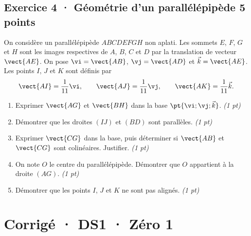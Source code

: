 \subsection*{Exercice 4 · Géométrie d'un parallélépipède \hfill 5 points}On considère un parallélépipède $ABCDEFGH$ non aplati. Les sommets $E$, $F$, $G$ et $H$ sont les images respectives de $A$, $B$, $C$ et $D$ par la translation de vecteur $\vect{AE}$.
On pose $\vi=\vect{AB}$, $\vj=\vect{AD}$ et $\vec k=\vect{AE}$.
Les points $I$, $J$ et $K$ sont définis par
\[\vect{AI}=\frac1{11}\vi,\qquad\vect{AJ}=\frac1{11}\vj,\qquad\vect{AK}=\frac1{11}\vec k.\]

\begin{enumerate}

\item Exprimer $\vect{AG}$ et $\vect{BH}$ dans la base $\pt{\vi;\vj;\vec k}$. \hfill\textit{(1 pt)}

\item Démontrer que les droites $(IJ)$ et $(BD)$ sont parallèles. \hfill\textit{(1 pt)}

\item Exprimer $\vect{CG}$ dans la base, puis déterminer si $\vect{AB}$ et $\vect{CG}$ sont colinéaires. Justifier. \hfill\textit{(1 pt)}

\item On note $O$ le centre du parallélépipède. Démontrer que $O$ appartient à la droite $(AG)$. \hfill\textit{(1 pt)}

\item Démontrer que les points $I$, $J$ et $K$ ne sont pas alignés. \hfill\textit{(1 pt)}

\end{enumerate}

\ifmxteacher\mxnewpage

\section*{Corrigé · DS1 · Zéro 1}\label{cor:1-1}

